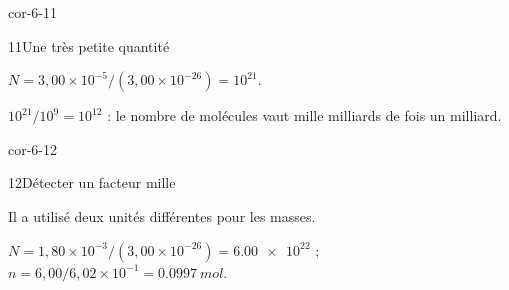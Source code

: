 \begin{blocLivre}{cor-6-11}\begin{corrige}{11}{Une très petite quantité}
\begin{questions}
\item $N=3,00\times10^{-5}/(3,00\times10^{-26})=10^{21}$.
\item $10^{21}/10^9=10^{12}$ : le nombre de molécules vaut mille milliards de fois un milliard.
\end{questions}
\end{corrige}\end{blocLivre}
\begin{blocLivre}{cor-6-12}\begin{corrige}{12}{Détecter un facteur mille}
\begin{questions}
\item Il a utilisé deux unités différentes pour les masses.
\item $N=1,80\times10^{-3}/(3,00\times10^{-26})=\num{6,00e22}$ ; $n=6,00/6,02\times10^{-1}=\qty{0,0997}{mol}$.
\end{questions}
\end{corrige}\end{blocLivre}

